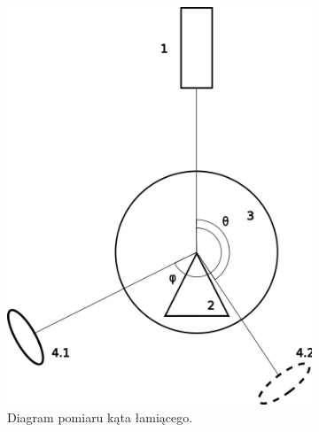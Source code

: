 \documentclass[12pt]{article}
\begin{document}
\begin{figure}[H]
    \centering
    \begin{subfigure}{0.3\textwidth}
        \centering
        \includegraphics[width=\linewidth]{kat_pryzmatu}
        \caption{Diagram pomiaru kąta łamiącego.}
        \label{fig:diagram_kat_pryzmatu}
    \end{subfigure}
    \hspace{1in}
    \begin{subfigure}{0.3\textwidth}
        \centering

\end{subfigure}
\end{figure}
\end{document}
